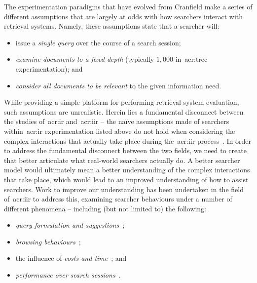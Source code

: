 The experimentation paradigms that have evolved from Cranfield make a series of different assumptions that are largely at odds with how searchers interact with retrieval systems. Namely, these assumptions state that a searcher will:

\vspace*{-3mm}
\begin{itemize}
    \item{issue a \emph{single query} over the course of a search session;}
    \item{\emph{examine documents to a fixed depth} (typically $1,000$ in~\gls{acr:trec} experimentation); and}
    \item{\emph{consider all documents to be relevant} to the given information need.}
\end{itemize}
\vspace*{-3mm}

While providing a simple platform for performing retrieval system evaluation, such assumptions are unrealistic. Herein lies a fundamental disconnect between the studies of~\gls{acr:ir} and~\gls{acr:iir} -- the na\"{i}ve assumptions made of searchers within~\gls{acr:ir} experimentation listed above do not hold when considering the complex interactions that actually take place during the~\gls{acr:iir} process~\citep{ingwersen2005theturn}. In order to address the fundamental disconnect between the two fields, we need to create  that better articulate what real-world searchers actually do. A better searcher model would ultimately mean a better understanding of the complex interactions that take place, which would lead to an improved understanding of how to assist searchers. Work to improve our understanding has been undertaken in the field of~\gls{acr:iir} to address this, examining searcher behaviours under a number of different phenomena -- including (but not limited to) the following:
\vspace*{-2mm}
\begin{itemize}
    \item{\emph{query formulation and suggestions}~\citep{azzopardi2009query_side, azzopardi2007languages, baskaya2013behavioural_factors, carterette2015test_collections, jordan2006cqg, keskustalo2009querying, verberne2015personalised_queries};}
    \item{\emph{browsing behaviours}~\citep{carterette2015test_collections, chuklin2015click_models, guo2009click_chain, pakkonen2015behavioural_dimensions, smucker2011user_strategies};}
    \item{the influence of \emph{costs and time}~\citep{azzopardi2011economics, baskaya2013behavioural_factors}; and}
    \item{\emph{performance over search sessions}~\citep{luo2014winwin, luo2015pomdp}.}
\end{itemize}
\vspace*{-2mm}

